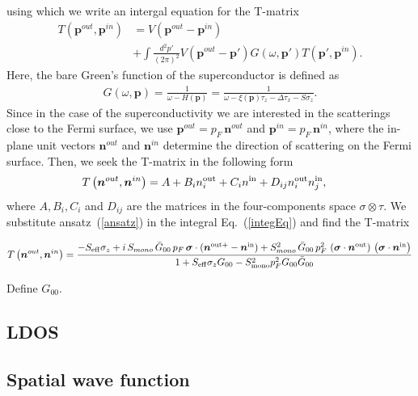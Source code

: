 \documentclass[twocolumn,showpacs,floatfix,nofootinbib,longbibliography]{revtex4-1}
\begin{document}
using which we write an intergal equation for the T-matrix
\begin{align}
	T\left(\bm p^{out},\bm p^{in}\right) &= V \left(\bm p^{out}-\bm p^{in}\right) \nonumber \\
	& + \int \frac{d^2p'}{(2\pi)^2} V\left(\bm p^{out}-\bm p'\right) G(\omega,\bm p')  T\left(\bm p',\bm p^{in}\right).
	\label{integEq}
\end{align}
Here, the bare Green's function of the superconductor is defined as 
\begin{align}
	G(\omega,\bm p) = \frac{1}{\omega-H(\bm p)} = \frac{1}{\omega-\xi(\bm p)\tau_z-\Delta \tau_x - S\sigma_z}.
\end{align}
Since in the case of the superconductivity we are interested in the scatterings close to the Fermi surface, we use $\bm p^{out} = p_F\, \bm n^{out}$ and $\bm p^{in} = p_F \,\bm n^{in}$, where the in-plane unit vectors $\bm n^{out}$ and $\bm n^{in}$ determine the direction of scattering on the Fermi surface.  Then, we seek the T-matrix in the following form
\begin{align}
	T\left(\bm n^{out},\bm n^{in}\right) &= A + B_i n^{\rm out}_i + C_i n^{\rm in} + D_{ij} n^{\rm out}_i n^{\rm in}_j, \label{ansatz}
\end{align}
where  $A,B_i,C_i$ and $D_{ij}$ are the matrices in the four-components space $\sigma\otimes\tau$. We substitute ansatz~(\ref{ansatz}) in the integral Eq.~(\ref{integEq}) and find the T-matrix
\begin{widetext}
\begin{equation}
	T\left(\bm n^{out},\bm n^{in}\right) = \frac{-S_{\rm eff}\sigma_z+i\,S_{mono}\, \bar G_{00}\, p_F \,\bm \sigma\cdot(\bm n^{\rm out+}- \bm n^{\rm in}) +S^2_{mono}\, \bar G_{00}\, p^2_F \,\left(\bm \sigma\cdot\bm n^{\rm out}\right)\,\left(\bm \sigma\cdot \bm n^{\rm in}\right)}{1+S_{\rm eff}\sigma_zG_{00}-S^2_{\rm mono}p_F^2G_{00}\bar G_{00}}
\end{equation}
\end{widetext}
Define $G_{00}$. 
\subsection{LDOS} \label{sec:LDOS}
\subsection{Spatial wave function} \label{sec:wf}
\end{document}
